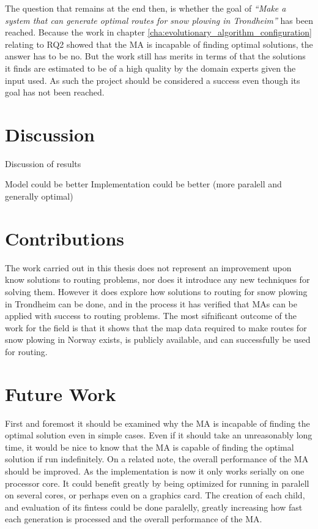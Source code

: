 The question that remains at the end then, is whether the goal of \emph{\enquote{Make a system that can generate optimal routes for snow plowing in Trondheim}} has been reached. Because the work in chapter \ref{cha:evolutionary_algorithm_configuration} relating to RQ2 showed that the MA is incapable of finding optimal solutions, the answer has to be no. But the work still has merits in terms of that the solutions it finds are estimated to be of a high quality by the domain experts given the input used. As such the project should be considered a success even though its goal has not been reached.

\section{Discussion}
Discussion of results

Model could be better
Implementation could be better (more paralell and generally optimal)



\section{Contributions}

The work carried out in this thesis does not represent an improvement upon know solutions to routing problems, nor does it introduce any new techniques for solving them. However it does explore how solutions to routing for snow plowing in Trondheim can be done, and in the process it has verified that MAs can be applied with success to routing problems. The most sifnificant outcome of the work for the field is that it shows that the map data required to make routes for snow plowing in Norway exists, is publicly available, and can successfully be used for routing. 

\section{Future Work}

First and foremost it should be examined why the MA is incapable of finding the optimal solution even in simple cases. Even if it should take an unreasonably long time, it would be nice to know that the MA is capable of finding the optimal solution if run indefinitely. On a related note, the overall performance of the MA should be improved. As the implementation is now it only works serially on one processor core. It could benefit greatly by being optimized for running in paralell on several cores, or perhaps even on a graphics card. The creation of each child, and evaluation of its fintess could be done paralelly, greatly increasing how fast each generation is processed and the overall performance of the MA.

